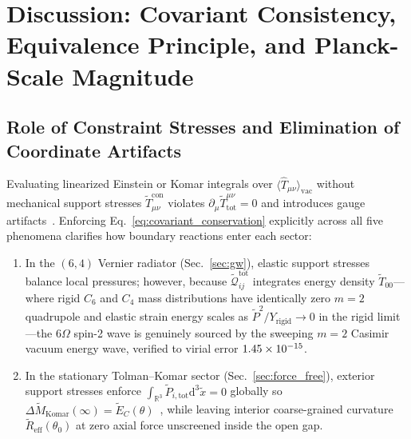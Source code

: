 \documentclass[aps,prd,twocolumn,10pt,showkeys,nofootinbib,floatfix,longbibliography]{revtex4-2}
\newcommand{\dd}{\mathrm{d}}
\begin{document}
\section{Discussion: Covariant Consistency, Equivalence Principle, and Planck-Scale Magnitude}
\label{sec:discussion}

\subsection{Role of Constraint Stresses and Elimination of Coordinate Artifacts}
Evaluating linearized Einstein or Komar integrals over $\langle \hat{T}_{\mu\nu}\rangle_{\mathrm{vac}}$ without mechanical support stresses $\tilde{T}_{\mu\nu}^{\mathrm{con}}$ violates $\partial_\mu \tilde{T}^{\mu\nu}_{\mathrm{tot}} = 0$ and introduces gauge artifacts~\cite{bimonte2006,fulling2007,sorge2021buoyancy}. Enforcing Eq.~\eqref{eq:covariant_conservation} explicitly across all five phenomena clarifies how boundary reactions enter each sector:
\begin{enumerate}
    \item In the $(6,4)$ Vernier radiator (Sec.~\ref{sec:gw}), elastic support stresses balance local pressures; however, because $\tilde{\mathcal{Q}}_{ij}^{\mathrm{tot}}$ integrates energy density $\tilde{T}_{00}$---where rigid $C_6$ and $C_4$ mass distributions have identically zero $m=2$ quadrupole and elastic strain energy scales as $\tilde{P}^2/Y_{\mathrm{rigid}} \to 0$ in the rigid limit---the $6\Omega$ spin-2 wave is genuinely sourced by the sweeping $m=2$ Casimir vacuum energy wave, verified to virial error $1.45\times 10^{-15}$.
    \item In the stationary Tolman--Komar sector (Sec.~\ref{sec:force_free}), exterior support stresses enforce $\int_{\mathbb{R}^3}\tilde{P}_{i,\mathrm{tot}}\dd^3\tilde{x} = 0$ globally so $\Delta\tilde{M}_{\mathrm{Komar}}(\infty) = \tilde{E}_C(\theta)$~\cite{fulling2007,sorge2021buoyancy}, while leaving interior coarse-grained curvature $\tilde{R}_{\mathrm{eff}}(\theta_0)$ at zero axial force unscreened inside the open gap.
\end{enumerate}
\end{document}
